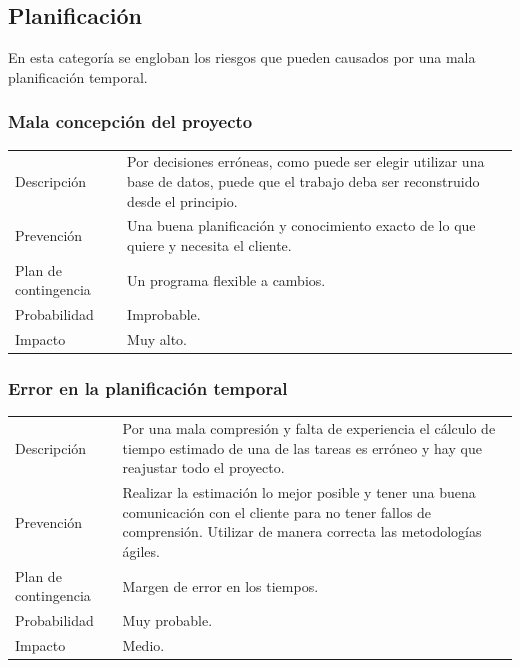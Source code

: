 \subsection{Planificaci\'{o}n}
En esta categor\'{i}a se engloban los riesgos que pueden causados por una mala planificaci\'{o}n temporal.
\subsubsection{Mala concepci\'{o}n del proyecto}
\begin{table}[H]
    \begin{center}
       \begin{tabular}{l p{8cm}}
           Descripci\'{o}n                 & Por decisiones erróneas, como puede ser elegir utilizar una
           base de datos, puede que el trabajo deba ser reconstruido desde el principio. \\
           Prevenci\'{o}n                  & Una buena planificación y conocimiento exacto de lo que quiere y necesita el cliente. 
           									  \\ 
           Plan de contingencia            & Un programa flexible a cambios. \\
           Probabilidad                    & Improbable. \\
           Impacto                         & Muy alto. \\
        \end{tabular}
    \end{center}
    
\end{table}
\subsubsection{Error en la planificaci\'{o}n temporal}
\begin{table}[H]
    \begin{center}
        \begin{tabular}{l p{8cm}}
            Descripci\'{o}n                 & Por una mala compresi\'on y falta de experiencia el c\'alculo
            de tiempo estimado de una de las tareas es err\'oneo y hay que reajustar todo el proyecto. \\
            Prevenci\'{o}n                  & Realizar la estimación lo mejor posible y tener una buena
            								  comunicaci\'on con el cliente para no tener fallos de comprensión. Utilizar de manera 
            								  correcta las metodolog\'ias \'agiles. \\ 
            Plan de contingencia            & Margen de error en los tiempos. \\
            Probabilidad                    & Muy probable. \\
            Impacto                         & Medio. \\
        \end{tabular}
    \end{center}
    
\end{table}
